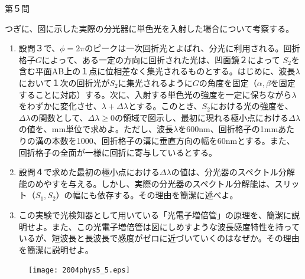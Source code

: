 \documentclass[fleqn]{jbook}
\begin{document}
\begin{question}{第５問}{}
\begin{enumerate}
\end{enumerate}

つぎに、図に示した実際の分光器に単色光を入射した場合について考察する。

\setcounter{enumi}{3}
\begin{enumerate}
\item
設問３で、$\phi=2\pi$のピークは一次回折光とよばれ、分光に利用される。回折格子$G$によって、ある一定の方向に回折された光は、凹面鏡２によって
$S_2$を含む平面AB上の１点に位相差なく集光されるものとする。はじめに、波長$\lambda$において１次の回折光が$S_2$に集光されるように$G$の角度を固定（$\alpha,\beta$を固定することに対応）する。次に、入射する単色光の強度を一定に保ちながら$\lambda$をわずかに変化させ、$\lambda+\Delta\lambda$とする。このとき、$S_2$における光の強度を、$\Delta\lambda$の関数として、$\Delta\lambda\ge 0$の領域で図示し、最初に現れる極小点における$\Delta\lambda$の値を、mm単位で求めよ。ただし、波長$\lambda$を600nm、回折格子の1mmあたりの溝の本数を1000、回折格子の溝に垂直方向の幅を60nmとする。また、回折格子の全面が一様に回折に寄与しているとする。

\item
設問４で求めた最初の極小点における$\Delta\lambda$の値は、分光器のスペクトル分解能のめやすを与える。しかし、実際の分光器のスペクトル分解能は、スリット（$S_1,S_2$）の幅にも依存する。その理由を簡潔に述べよ。
\item
この実験で光検知器として用いている「光電子増倍管」の原理を、簡潔に説明せよ。また、この光電子増倍管は図にしめすような波長感度特性を持っているが、短波長と長波長で感度がゼロに近づいていくのはなぜか。その理由を簡潔に説明せよ。\end{enumerate}
\begin{figure}[htbp]
\begin{center}
\texttt{[image: 2004phys5\_5.eps]}
\caption{}
\end{center}
\end{figure}
\end{question}
\end{document}
